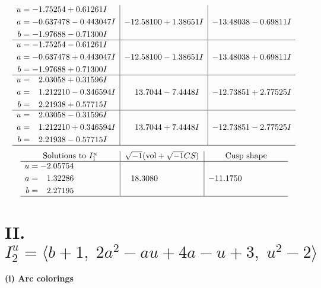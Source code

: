 \documentclass[1p]{elsarticle_modified}
\theoremstyle{definition}
\newcommand{\I}{\sqrt{-1}}
\begin{document}
$$\begin{array}{c|c|c}
\begin{aligned}
u &= -1.75254 + 0.61261 I \\
a &= -0.637478 - 0.443047 I \\
b &= -1.97688 - 0.71300 I\end{aligned}
 & -12.58100 + 1.38651 I & -13.48038 - 0.69811 I \\ \hline\begin{aligned}
u &= -1.75254 - 0.61261 I \\
a &= -0.637478 + 0.443047 I \\
b &= -1.97688 + 0.71300 I\end{aligned}
 & -12.58100 - 1.38651 I & -13.48038 + 0.69811 I \\ \hline\begin{aligned}
u &= \phantom{-}2.03058 + 0.31596 I \\
a &= \phantom{-}1.212210 - 0.346594 I \\
b &= \phantom{-}2.21938 + 0.57715 I\end{aligned}
 & \phantom{-}13.7044 - 7.4448 I & -12.73851 + 2.77525 I \\ \hline\begin{aligned}
u &= \phantom{-}2.03058 - 0.31596 I \\
a &= \phantom{-}1.212210 + 0.346594 I \\
b &= \phantom{-}2.21938 - 0.57715 I\end{aligned}
 & \phantom{-}13.7044 + 7.4448 I & -12.73851 - 2.77525 I\\
 \hline 
 \end{array}$$\newpage$$\begin{array}{c|c|c}  
\text{Solutions to }I^u_{1}& \I (\text{vol} + \sqrt{-1}CS) & \text{Cusp shape}\\
 \hline 
\begin{aligned}
u &= -2.05754\phantom{ +0.000000I} \\
a &= \phantom{-}1.32286\phantom{ +0.000000I} \\
b &= \phantom{-}2.27195\phantom{ +0.000000I}\end{aligned}
 & \phantom{-}18.3080\phantom{ +0.000000I} & -11.1750\phantom{ +0.000000I}\\
 \hline 
 \end{array}$$\newpage\newpage\renewcommand{\arraystretch}{1}
\centering \section*{II. $I^u_{2}= \langle b+1,\;2 a^2- a u+4 a- u+3,\;u^2-2 \rangle$}
\flushleft \textbf{(i) Arc colorings}\\
\end{document}
